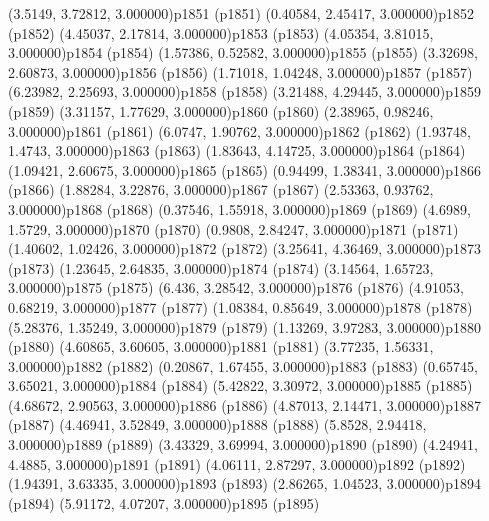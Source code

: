 \psPoint(3.5149, 3.72812, 3.000000){p1851}
\psdot(p1851)
\psPoint(0.40584, 2.45417, 3.000000){p1852}
\psdot(p1852)
\psPoint(4.45037, 2.17814, 3.000000){p1853}
\psdot(p1853)
\psPoint(4.05354, 3.81015, 3.000000){p1854}
\psdot(p1854)
\psPoint(1.57386, 0.52582, 3.000000){p1855}
\psdot(p1855)
\psPoint(3.32698, 2.60873, 3.000000){p1856}
\psdot(p1856)
\psPoint(1.71018, 1.04248, 3.000000){p1857}
\psdot(p1857)
\psPoint(6.23982, 2.25693, 3.000000){p1858}
\psdot(p1858)
\psPoint(3.21488, 4.29445, 3.000000){p1859}
\psdot(p1859)
\psPoint(3.31157, 1.77629, 3.000000){p1860}
\psdot(p1860)
\psPoint(2.38965, 0.98246, 3.000000){p1861}
\psdot(p1861)
\psPoint(6.0747, 1.90762, 3.000000){p1862}
\psdot(p1862)
\psPoint(1.93748, 1.4743, 3.000000){p1863}
\psdot(p1863)
\psPoint(1.83643, 4.14725, 3.000000){p1864}
\psdot(p1864)
\psPoint(1.09421, 2.60675, 3.000000){p1865}
\psdot(p1865)
\psPoint(0.94499, 1.38341, 3.000000){p1866}
\psdot(p1866)
\psPoint(1.88284, 3.22876, 3.000000){p1867}
\psdot(p1867)
\psPoint(2.53363, 0.93762, 3.000000){p1868}
\psdot(p1868)
\psPoint(0.37546, 1.55918, 3.000000){p1869}
\psdot(p1869)
\psPoint(4.6989, 1.5729, 3.000000){p1870}
\psdot(p1870)
\psPoint(0.9808, 2.84247, 3.000000){p1871}
\psdot(p1871)
\psPoint(1.40602, 1.02426, 3.000000){p1872}
\psdot(p1872)
\psPoint(3.25641, 4.36469, 3.000000){p1873}
\psdot(p1873)
\psPoint(1.23645, 2.64835, 3.000000){p1874}
\psdot(p1874)
\psPoint(3.14564, 1.65723, 3.000000){p1875}
\psdot(p1875)
\psPoint(6.436, 3.28542, 3.000000){p1876}
\psdot(p1876)
\psPoint(4.91053, 0.68219, 3.000000){p1877}
\psdot(p1877)
\psPoint(1.08384, 0.85649, 3.000000){p1878}
\psdot(p1878)
\psPoint(5.28376, 1.35249, 3.000000){p1879}
\psdot(p1879)
\psPoint(1.13269, 3.97283, 3.000000){p1880}
\psdot(p1880)
\psPoint(4.60865, 3.60605, 3.000000){p1881}
\psdot(p1881)
\psPoint(3.77235, 1.56331, 3.000000){p1882}
\psdot(p1882)
\psPoint(0.20867, 1.67455, 3.000000){p1883}
\psdot(p1883)
\psPoint(0.65745, 3.65021, 3.000000){p1884}
\psdot(p1884)
\psPoint(5.42822, 3.30972, 3.000000){p1885}
\psdot(p1885)
\psPoint(4.68672, 2.90563, 3.000000){p1886}
\psdot(p1886)
\psPoint(4.87013, 2.14471, 3.000000){p1887}
\psdot(p1887)
\psPoint(4.46941, 3.52849, 3.000000){p1888}
\psdot(p1888)
\psPoint(5.8528, 2.94418, 3.000000){p1889}
\psdot(p1889)
\psPoint(3.43329, 3.69994, 3.000000){p1890}
\psdot(p1890)
\psPoint(4.24941, 4.4885, 3.000000){p1891}
\psdot(p1891)
\psPoint(4.06111, 2.87297, 3.000000){p1892}
\psdot(p1892)
\psPoint(1.94391, 3.63335, 3.000000){p1893}
\psdot(p1893)
\psPoint(2.86265, 1.04523, 3.000000){p1894}
\psdot(p1894)
\psPoint(5.91172, 4.07207, 3.000000){p1895}
\psdot(p1895)
